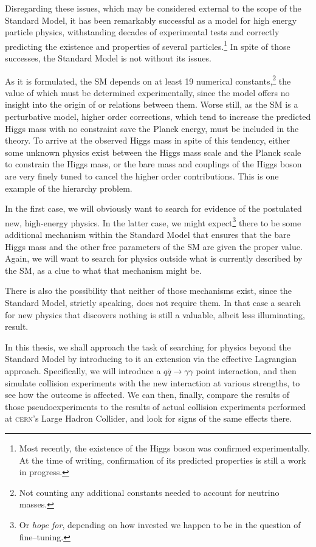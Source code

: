 Disregarding these issues, which may be considered external to the scope of the Standard Model, it has been remarkably successful as a model for high energy particle physics, withstanding decades of experimental tests and correctly predicting the existence and properties of several particles.\footnote{Most recently, the existence of the Higgs boson was confirmed experimentally. At the time of writing, confirmation of its predicted properties is still a work in progress.} In spite of those successes, the Standard Model is not without its issues.

As it is formulated, the SM depends on at least 19 numerical constants,\footnote{Not counting any additional constants needed to account for neutrino masses.} the value of which must be determined experimentally, since the model offers no insight into the origin of or relations between them. Worse still, as the SM is a perturbative model, higher order corrections, which tend to increase the predicted Higgs mass with no constraint save the Planck energy, must be included in the theory. To arrive at the observed Higgs mass in spite of this tendency, either some unknown physics exist between the Higgs mass scale and the Planck scale to constrain the Higgs mass, or the bare mass and couplings of the Higgs boson are very finely tuned to cancel the higher order contributions. This is one example of the hierarchy problem.

In the first case, we will obviously want to search for evidence of the postulated new, high-energy physics. In the latter case, we might expect\footnote{Or \emph{hope for}, depending on how invested we happen to be in the question of fine--tuning.} there to be some additional mechanism within the Standard Model that ensures that the bare Higgs mass and the other free parameters of the SM are given the proper value. Again, we will want to search for physics outside what is currently described by the SM, as a clue to what that mechanism might be.

There is also the possibility that neither of those mechanisms exist, since the Standard Model, strictly speaking, does not require them. In that case a search for new physics that discovers nothing is still a valuable, albeit less illuminating, result.

In this thesis, we shall approach the task of searching for physics beyond the Standard Model by introducing to it an extension via the effective Lagrangian approach. Specifically, we will introduce a $q\bar q\rightarrow\gamma\gamma$ point interaction, and then simulate collision experiments with the new interaction at various strengths, to see how the outcome is affected. We can then, finally, compare the results of those pseudoexperiments to the results of actual collision experiments performed at \textsc{cern}'s Large Hadron Collider, and look for signs of the same effects there.